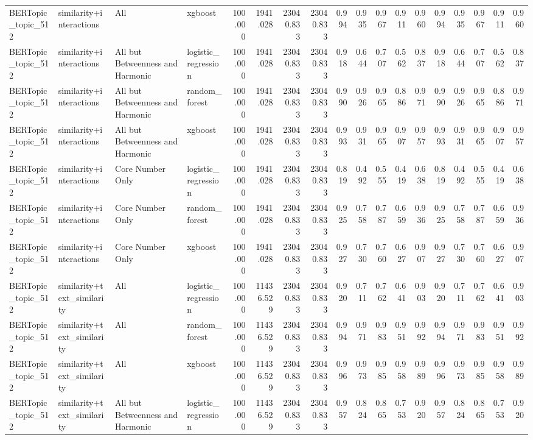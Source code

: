\begin{tabular}{llllrrrrrrrrrrrrrr}
BERTopic_topic_512 & similarity+interactions & All & xgboost & 100.000 & 1941.028 & 23040.833 & 23040.833 & 0.994 & 0.935 & 0.967 & 0.911 & 0.960 & 0.994 & 0.935 & 0.967 & 0.911 & 0.960 \\
BERTopic_topic_512 & similarity+interactions & All but Betweenness and Harmonic & logistic_regression & 100.000 & 1941.028 & 23040.833 & 23040.833 & 0.918 & 0.644 & 0.707 & 0.562 & 0.837 & 0.918 & 0.644 & 0.707 & 0.562 & 0.837 \\
BERTopic_topic_512 & similarity+interactions & All but Betweenness and Harmonic & random_forest & 100.000 & 1941.028 & 23040.833 & 23040.833 & 0.990 & 0.926 & 0.965 & 0.886 & 0.971 & 0.990 & 0.926 & 0.965 & 0.886 & 0.971 \\
BERTopic_topic_512 & similarity+interactions & All but Betweenness and Harmonic & xgboost & 100.000 & 1941.028 & 23040.833 & 23040.833 & 0.993 & 0.931 & 0.965 & 0.907 & 0.957 & 0.993 & 0.931 & 0.965 & 0.907 & 0.957 \\
BERTopic_topic_512 & similarity+interactions & Core Number Only & logistic_regression & 100.000 & 1941.028 & 23040.833 & 23040.833 & 0.819 & 0.492 & 0.555 & 0.419 & 0.638 & 0.819 & 0.492 & 0.555 & 0.419 & 0.638 \\
BERTopic_topic_512 & similarity+interactions & Core Number Only & random_forest & 100.000 & 1941.028 & 23040.833 & 23040.833 & 0.925 & 0.758 & 0.787 & 0.659 & 0.936 & 0.925 & 0.758 & 0.787 & 0.659 & 0.936 \\
BERTopic_topic_512 & similarity+interactions & Core Number Only & xgboost & 100.000 & 1941.028 & 23040.833 & 23040.833 & 0.927 & 0.730 & 0.760 & 0.627 & 0.907 & 0.927 & 0.730 & 0.760 & 0.627 & 0.907 \\
BERTopic_topic_512 & similarity+text_similarity & All & logistic_regression & 100.000 & 11436.529 & 23040.833 & 23040.833 & 0.920 & 0.711 & 0.762 & 0.641 & 0.903 & 0.920 & 0.711 & 0.762 & 0.641 & 0.903 \\
BERTopic_topic_512 & similarity+text_similarity & All & random_forest & 100.000 & 11436.529 & 23040.833 & 23040.833 & 0.994 & 0.971 & 0.983 & 0.951 & 0.992 & 0.994 & 0.971 & 0.983 & 0.951 & 0.992 \\
BERTopic_topic_512 & similarity+text_similarity & All & xgboost & 100.000 & 11436.529 & 23040.833 & 23040.833 & 0.996 & 0.973 & 0.985 & 0.958 & 0.989 & 0.996 & 0.973 & 0.985 & 0.958 & 0.989 \\
BERTopic_topic_512 & similarity+text_similarity & All but Betweenness and Harmonic & logistic_regression & 100.000 & 11436.529 & 23040.833 & 23040.833 & 0.957 & 0.824 & 0.865 & 0.753 & 0.920 & 0.957 & 0.824 & 0.865 & 0.753 & 0.920 \\

\end{tabular}
